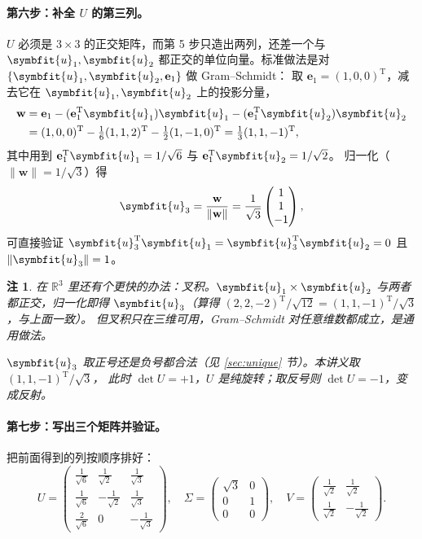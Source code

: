 \documentclass[UTF8, 11pt, a4paper, fontset=windows]{ctexart}
\theoremstyle{cnthm}
\theoremstyle{cndef}
\newtheorem{rem}[defn]{注}
\newcommand{\T}{^{\mathrm{T}}}
\newcommand{\R}{\mathbb{R}}
\newcommand{\nrm}[1]{\lVert #1 \rVert}
\newcommand{\bu}{\symbfit{u}}
\begin{document}
\paragraph{第六步：补全 $U$ 的第三列。}
$U$ 必须是 $3\times3$ 的正交矩阵，而第 5 步只造出两列，还差一个与 $\bu_1,\bu_2$
都正交的单位向量。标准做法是对 $\{\bu_1,\bu_2,\mathbf{e}_1\}$ 做 Gram--Schmidt：
取 $\mathbf{e}_1=(1,0,0)\T$，减去它在 $\bu_1,\bu_2$ 上的投影分量，
\begin{equation}
\begin{aligned}
  \mathbf{w}&=\mathbf{e}_1-(\mathbf{e}_1\T\bu_1)\bu_1-(\mathbf{e}_1\T\bu_2)\bu_2\\
  &=(1,0,0)\T-\tfrac16(1,1,2)\T-\tfrac12(1,-1,0)\T
   =\tfrac13(1,1,-1)\T ,
\end{aligned}
\end{equation}
其中用到 $\mathbf{e}_1\T\bu_1=1/\sqrt6$ 与 $\mathbf{e}_1\T\bu_2=1/\sqrt2$。
归一化（$\nrm{\mathbf{w}}=1/\sqrt3$）得
\begin{equation}
  \bu_3=\frac{\mathbf{w}}{\nrm{\mathbf{w}}}
  =\frac{1}{\sqrt3}\begin{pmatrix}1\\1\\-1\end{pmatrix},
\end{equation}
可直接验证 $\bu_3\T\bu_1=\bu_3\T\bu_2=0$ 且 $\nrm{\bu_3}=1$。

\begin{rem}
在 $\R^3$ 里还有个更快的办法：叉积。$\bu_1\times\bu_2$ 与两者都正交，归一化即得
$\bu_3$（算得 $(2,2,-2)\T/\sqrt{12}=(1,1,-1)\T/\sqrt3$，与上面一致）。
但叉积只在三维可用，Gram--Schmidt 对任意维数都成立，是通用做法。

$\bu_3$ 取正号还是负号都合法（见 \ref{sec:unique} 节）。本讲义取 $(1,1,-1)\T/\sqrt3$，
此时 $\det U=+1$，$U$ 是纯旋转；取反号则 $\det U=-1$，变成反射。
\end{rem}

\paragraph{第七步：写出三个矩阵并验证。}
把前面得到的列按顺序排好：
\begin{equation}
  U=\begin{pmatrix}
  \frac{1}{\sqrt6}&\frac{1}{\sqrt2}&\frac{1}{\sqrt3}\\[3pt]
  \frac{1}{\sqrt6}&-\frac{1}{\sqrt2}&\frac{1}{\sqrt3}\\[3pt]
  \frac{2}{\sqrt6}&0&-\frac{1}{\sqrt3}
  \end{pmatrix},\quad
  \Sigma=\begin{pmatrix}\sqrt3&0\\0&1\\0&0\end{pmatrix},\quad
  V=\begin{pmatrix}
  \frac{1}{\sqrt2}&\frac{1}{\sqrt2}\\[3pt]
  \frac{1}{\sqrt2}&-\frac{1}{\sqrt2}
  \end{pmatrix}.
\end{equation}
\end{document}
